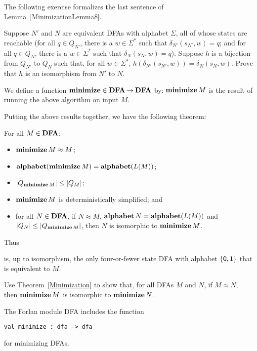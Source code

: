 The following exercise formalizes the last sentence of
Lemma~\ref{MinimizationLemma8}.

\begin{exercise}
Suppose $N'$ and $N$ are equivalent DFAs with alphabet $\Sigma$, all
of whose states are reachable (for all $q\in Q_{N'}$, there is a
$w\in\Sigma^*$ such that $\delta_{N'}(s_{N'},w) = q$; and for all
$q\in Q_{N}$, there is a $w\in\Sigma^*$ such that
$\delta_{N}(s_{N},w) = q$). Suppose $h$ is a bijection from $Q_{N'}$
to $Q_N$ such that, for all $w\in\Sigma^*$,
$h(\delta_{N'}(s_{N'},w))=\delta_N(s_N,w)$. Prove that $h$ is
an isomorphism from $N'$ to $N$.
\end{exercise}

We define a function $\mathbf{minimize}\in\mathbf{DFA}\mathbin{\to}\mathbf{DFA}$ by:
$\mathbf{minimize}\,M$ is the result of running the above algorithm on
input $M$.

Putting the above results together, we have the following theorem:
\begin{theorem}
\label{Minimization}
For all $M\in\mathbf{DFA}$:
\begin{itemize}
\item $\mathbf{minimize}\,M\approx M$;

\item $\mathbf{alphabet}(\mathbf{minimize}\,M)=\mathbf{alphabet}(L(M))$;

\item $|Q_{\mathbf{minimize}\,M}| \leq |Q_M|$;

\item $\mathbf{minimize}\,M$ is deterministically simplified; and

\item for all $N\in\mathbf{DFA}$, if $N\approx M$, $\mathbf{alphabet}\,N=\mathbf{alphabet}(L(M))$ and
$|Q_N|\leq|Q_{\mathbf{minimize}\,M}|$, then $N$ is isomorphic to $\mathbf{minimize}\,M$.
\end{itemize}
\end{theorem}

Thus
\begin{center}

\end{center}
is, up to isomorphism, the only four-or-fewer state DFA with alphabet
$\{\mathsf{0},\mathsf{1}\}$ that is equivalent to $M$.

\begin{exercise}
Use Theorem~\ref{Minimization} to show that, for all DFAs $M$ and $N$,
if $M\approx N$, then $\mathbf{minimize}\,M$ is isomorphic to $\mathbf{minimize}\,N$.
\end{exercise}

The Forlan module DFA includes the function
\begin{verbatim}
val minimize : dfa -> dfa
\end{verbatim}
for minimizing DFAs.


